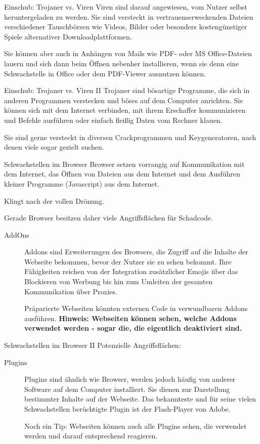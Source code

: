 \documentclass[hyperref={colorlinks,linkcolor=white}, utf8]{beamer}
\begin{document}
	\begin{frame}{Einschub: Trojaner vs. Viren}
		Viren sind darauf angewiesen, vom Nutzer selbst heruntergeladen zu werden. Sie sind versteckt in vertrauenserweckenden Dateien verschiedener Tauschbörsen wie Videos, Bilder oder besonders kostengünstiger Spiele alternativer Downloadplattformen.
		
		Sie können aber auch in Anhängen von Mails wie PDF- oder MS Office-Dateien lauern und sich dann beim Öffnen nebenher installieren, wenn sie denn eine Schwachstelle in Office oder dem PDF-Viewer ausnutzen können.
	\end{frame}

	\begin{frame}{Einschub: Trojaner vs. Viren II}
		Trojaner sind bösartige Programme, die sich in anderen Programmen verstecken und böses auf dem Computer anrichten. Sie können sich mit dem Internet verbinden, mit ihrem Erschaffer kommunizieren und Befehle ausführen oder einfach fleißig Daten vom Rechner klauen.
		
		Sie sind gerne versteckt in diversen Crackprogrammen und Keygeneratoren, nach denen viele sogar gezielt suchen.
	\end{frame}

	\begin{frame}{Schwachstellen im Browser}
		Browser setzen vorrangig auf Kommunikation mit dem Internet, das Öffnen von Dateien aus dem Internet und dem Ausführen kleiner Programme (Javascript) aus dem Internet.
		
		Klingt nach der vollen Drönung.
		
		Gerade Browser besitzen daher viele Angriffsflächen für Schadcode. 
		\begin{description}
			\item[AddOns] {Addons sind Erweiterungen des Browsers, die Zugriff auf die Inhalte der Webseite bekommen, bevor der Nutzer sie zu sehen bekommt. Ihre Fähigkeiten reichen von der Integration zusätzlicher Emojis über das Blockieren von Werbung bis hin zum Umleiten der gesamten Kommunikation über Proxies. 
			
			Präparierte Webseiten könnten externen Code in verwundbaren Addons ausführen. \textbf{Hinweis: Webseiten können sehen, welche Addons verwendet werden - sogar die, die eigentlich deaktiviert sind.}}
		\end{description}
	\end{frame}

\begin{frame}{Schwachstellen im Browser II}
	Potenzielle Angriffsflächen:
	\begin{description}
		\item[Plugins] {Plugins sind ähnlich wie Browser, werden jedoch häufig von anderer Software auf dem Computer installiert. Sie dienen zur Darstellung bestimmter Inhalte auf der Webseite. Das bekannteste und für seine vielen Schwachstellen berüchtigte Plugin ist der Flash-Player von Adobe.
		
		Noch ein Tip: Webseiten können auch alle Plugins sehen, die verwendet werden und darauf entsprechend reagieren.}
	\end{description}
\end{frame}
	
\end{document}
